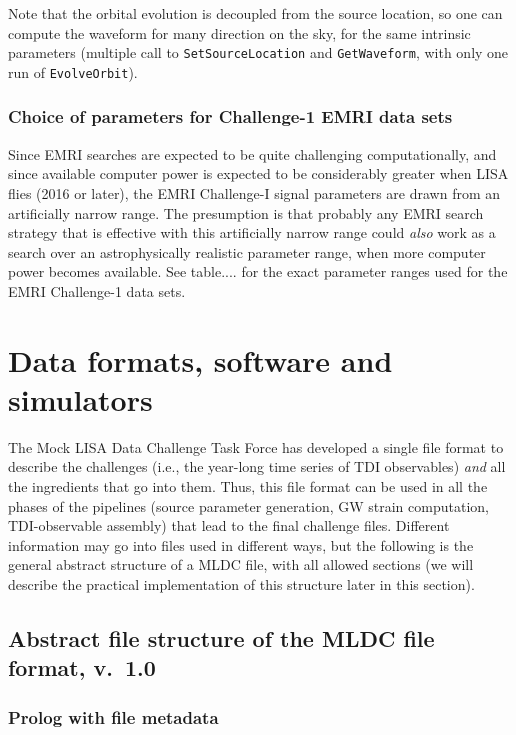 \documentclass[11pt]{report}
\begin{document}
Note that the orbital evolution is decoupled from the source location,
so one can compute the waveform for many direction on the sky, 
for the same intrinsic parameters (multiple call to {\tt SetSourceLocation} and {\tt GetWaveform}, with only one run of
{\tt EvolveOrbit}).

\subsection{Choice of parameters for Challenge-1 EMRI data sets}
Since EMRI searches are expected to be quite challenging computationally, and since
available computer power is expected to be considerably greater when LISA flies (2016 or later),
the EMRI Challenge-I signal parameters are drawn from an artificially narrow range. 
The presumption is that probably any EMRI search strategy that is effective with this 
artificially narrow range could {\it also} work as a search over an astrophysically realistic 
parameter range, when more computer power becomes available.
See table.... for the exact parameter ranges used for the EMRI Challenge-1 data sets.




%
%

\chapter{Data formats, software and simulators}

The Mock LISA Data Challenge Task Force has developed
a single file format to describe the challenges (i.e., the year-long time series of TDI observables) \emph{and} all the ingredients
that go into them. Thus, this file format can be used in all the phases of the pipelines (source parameter generation, GW strain computation, TDI-observable assembly) that lead to the final challenge files. Different information may go into files used in different ways, but the following is the general abstract structure of a MLDC file, with all allowed sections (we will describe the practical implementation of this structure later in this section).

\section{Abstract file structure of the MLDC file format, v.\ 1.0}

\subsection{Prolog with file metadata}
\end{document}
